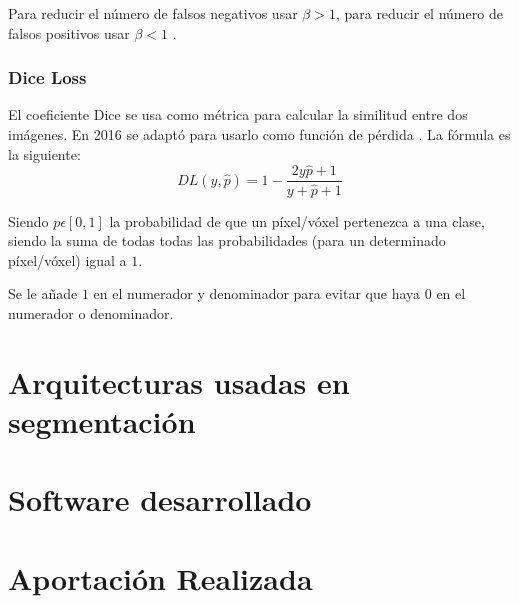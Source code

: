 Para reducir el número de falsos negativos usar $\beta > 1$, para reducir el número de falsos positivos usar $\beta < 1$ \cite{Jadon2020}.

\subsubsection{Dice Loss}

El coeficiente Dice se usa como métrica para calcular la similitud entre dos imágenes. En 2016 se adaptó para usarlo como función de pérdida \cite{Cardoso2017}. La fórmula es la siguiente:
\begin{equation}
DL(y,\hat{p})= 1 - \frac{2y\hat{p}+1}{y+\hat{p}+1}
\end{equation}

Siendo $p\epsilon[0,1]$ la probabilidad de que un píxel/vóxel pertenezca a una clase, siendo la suma de todas todas las probabilidades (para un determinado píxel/vóxel) igual a $1$.

Se le añade $1$ en el numerador y denominador para evitar que haya $0$ en el numerador o denominador.

\section{Arquitecturas usadas en segmentación}\label{sec:archs}
\section{Software desarrollado}\label{sec:software}
\section{Aportación Realizada}\label{sec:aportacion}
